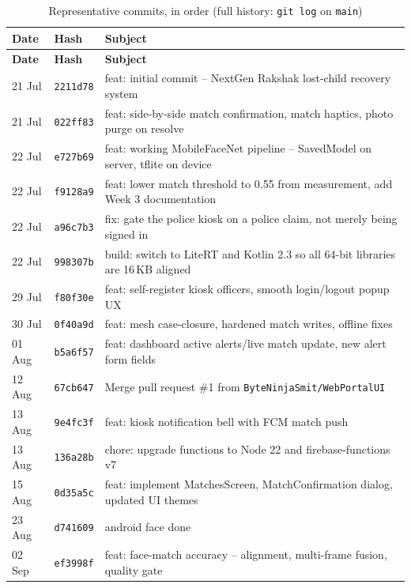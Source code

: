 \documentclass[12pt,a4paper,oneside]{report}
\begin{document}
\begin{longtable}{|p{1.7cm}|p{1.5cm}|p{9.5cm}|}
\caption{Representative commits, in order (full history: \texttt{git log} on \texttt{main})}
\label{tab:commits}\\
\hline
\textbf{Date} & \textbf{Hash} & \textbf{Subject} \\
\hline
\endfirsthead
\hline
\textbf{Date} & \textbf{Hash} & \textbf{Subject} \\
\hline
\endhead
21 Jul & \texttt{2211d78} & feat: initial commit -- NextGen Rakshak lost-child recovery system \\ \hline
21 Jul & \texttt{022ff83} & feat: side-by-side match confirmation, match haptics, photo purge on resolve \\ \hline
22 Jul & \texttt{e727b69} & feat: working MobileFaceNet pipeline -- SavedModel on server, tflite on device \\ \hline
22 Jul & \texttt{f9128a9} & feat: lower match threshold to 0.55 from measurement, add Week 3 documentation \\ \hline
22 Jul & \texttt{a96c7b3} & fix: gate the police kiosk on a police claim, not merely being signed in \\ \hline
22 Jul & \texttt{998307b} & build: switch to LiteRT and Kotlin 2.3 so all 64-bit libraries are 16\,KB aligned \\ \hline
29 Jul & \texttt{f80f30e} & feat: self-register kiosk officers, smooth login/logout popup UX \\ \hline
30 Jul & \texttt{0f40a9d} & feat: mesh case-closure, hardened match writes, offline fixes \\ \hline
01 Aug & \texttt{b5a6f57} & feat: dashboard active alerts/live match update, new alert form fields \\ \hline
12 Aug & \texttt{67cb647} & Merge pull request \#1 from \texttt{ByteNinjaSmit/WebPortalUI} \\ \hline
13 Aug & \texttt{9e4fc3f} & feat: kiosk notification bell with FCM match push \\ \hline
13 Aug & \texttt{136a28b} & chore: upgrade functions to Node 22 and firebase-functions v7 \\ \hline
15 Aug & \texttt{0d35a5c} & feat: implement MatchesScreen, MatchConfirmation dialog, updated UI themes \\ \hline
23 Aug & \texttt{d741609} & android face done \\ \hline
02 Sep & \texttt{ef3998f} & feat: face-match accuracy -- alignment, multi-frame fusion, quality gate \\ \hline

\end{longtable}
\end{document}
